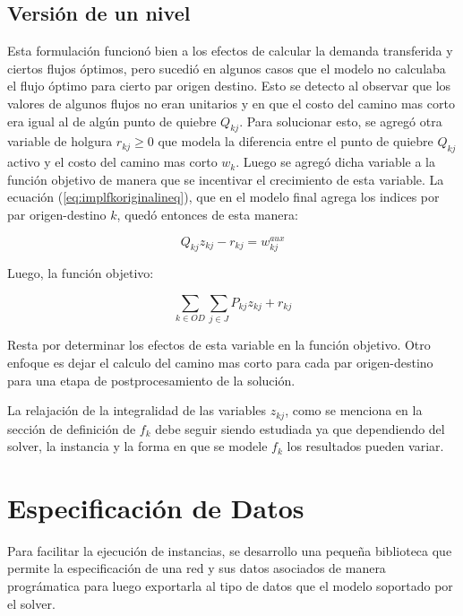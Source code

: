 \documentclass{article}
\begin{document}
  \subsection*{Versión de un nivel}

  Esta formulación funcionó bien a los efectos de calcular la demanda transferida y ciertos flujos óptimos, pero sucedió en algunos casos que el modelo no calculaba el flujo óptimo para cierto par origen destino. Esto se detecto al observar que los valores de algunos flujos no eran unitarios y en que el costo del camino mas corto era igual al de algún punto de quiebre $Q_{kj}$. Para solucionar esto, se agregó otra variable de holgura $r_{kj} \geq 0$ que modela la diferencia entre el punto de quiebre $Q_{kj}$ activo y el costo del camino mas corto $w_k$. Luego se agregó dicha variable a la función objetivo de manera que se incentivar el crecimiento de esta variable. La ecuación (\ref{eq:implfkoriginalineq}), que en el modelo final agrega los indices por par origen-destino $k$, quedó entonces de esta manera:

  \begin{equation}
    Q_{kj} z_{kj} - r_{kj} = w^{aux}_{kj}
  \end{equation}

  Luego, la función objetivo:

  \begin{equation}
    \sum_{k \in OD} \sum_{j \in J} P_{kj}z_{kj} + r_{kj}
  \end{equation}

  Resta por determinar los efectos de esta variable en la función objetivo. Otro enfoque es dejar el calculo del camino mas corto para cada par origen-destino para una etapa de postprocesamiento de la solución.

  La relajación de la integralidad de las variables $z_{kj}$, como se menciona en la sección de definición de $f_k$ debe seguir siendo estudiada ya que dependiendo del solver, la instancia y la forma en que se modele $f_k$ los resultados pueden variar.

  \section*{Especificación de Datos}

  Para facilitar la ejecución de instancias, se desarrollo una pequeña biblioteca que permite la especificación de una red y sus datos asociados de manera prográmatica para luego exportarla al tipo de datos que el modelo soportado por el solver.
\end{document}
